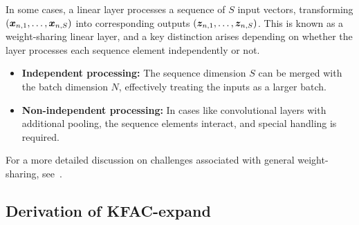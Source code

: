 \begin{caveat}
  In some cases, a linear layer processes a sequence of $S$ input vectors, transforming $({\bm{x}}_{n,1}, \dots, {\bm{x}}_{n, S})$ into corresponding outputs $({\bm{z}}_{n, 1}, \dots, {\bm{z}}_{n, S})$.
  This is known as a weight-sharing linear layer, and a key distinction arises depending on whether the layer processes each sequence element independently or not.
  \begin{itemize}
    \item \textbf{Independent processing:} The sequence dimension $S$ can be merged with the batch dimension $N$, effectively treating the inputs as a larger batch.
    \item \textbf{Non-independent processing:} In cases like convolutional layers with additional pooling, the sequence elements interact, and special handling is required.
  \end{itemize}

  For a more detailed discussion on challenges associated with general weight-sharing, see~\citet{eschenhagen2023kroneckerfactored}.
\end{caveat}

\switchcolumn[1]
\switchcolumn[0]

\subsection{Derivation of KFAC-expand}

